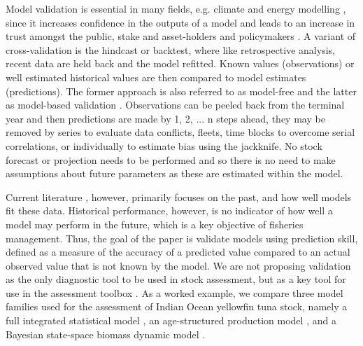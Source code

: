 \documentclass[12pt,halfline,a4paper,nonumbib]{ouparticle}
\begin{document}
  
Model validation is essential in many fields, e.g. climate and energy modelling \parencite{kell2019optimising}, since it increases confidence in the outputs of a model and leads to an increase in trust amongst the public, stake and asset-holders and policymakers \parencite[][]{saltelli2020five}. A variant of cross-validation is the hindcast or backtest, where like retrospective analysis, recent data are held back and the model refitted. Known values (observations) or well estimated historical values are then compared to model estimates (predictions). The former approach is also referred to as model-free and the latter as model-based validation \parencite{kell2016xval}. Observations can be peeled back from the terminal year and then predictions are made by 1, 2, ... n steps ahead, they may be removed by series to evaluate data conflicts, fleets, time blocks to overcome serial correlations, or individually to estimate bias using the jackknife. No stock forecast or projection needs to be performed and so there is no need to make assumptions about future parameters as these are estimated within the model.  

Current literature \parencite[e.g.][]{deroba2014simulation}, however, primarily focuses on the past, and how well models fit these data. Historical performance, however, is no indicator of how well a model may perform in the future, which is a key objective of fisheries management. Thus, the goal of the paper is validate models using prediction skill, defined as a measure of the accuracy of a predicted value compared to an actual observed value that is not known by the model. We are not proposing validation as the only diagnostic tool to be used in stock assessment, but as a key tool for use in the assessment toolbox \parencite{carvalho2020cookbook}. As a worked example, we compare three model families used for the assessment of Indian Ocean yellowfin tuna stock, namely a full integrated statistical model \parencite[SS,][]{methot2013stock}, an age-structured production model \parencite[ASPM,][]{maunder2015contemporary}, and a Bayesian state-space biomass dynamic model \parencite[JABBA,][]{winker2018jabba}.
\end{document}
